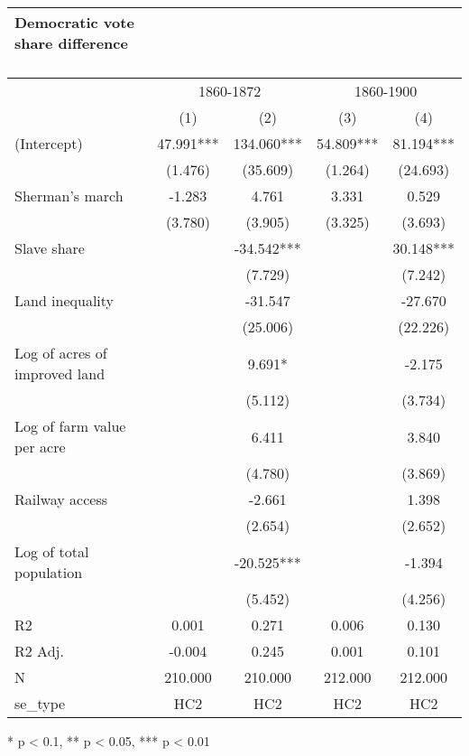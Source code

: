 \captionsetup[table]{labelformat=empty,skip=1pt}
\begin{longtable}{lcccc}
\caption*{
\large Democratic vote share difference\\ 
\small \\ 
} \\ 
\toprule
& \multicolumn{2}{c}{1860-1872} & \multicolumn{2}{c}{1860-1900} \\ 
 \cmidrule(lr){2-3}\cmidrule(lr){4-5}
  & (1) & (2) & (3) & (4) \\ 
\midrule
(Intercept) & 47.991*** & 134.060*** & 54.809*** & 81.194*** \\ 
 & (1.476) & (35.609) & (1.264) & (24.693) \\ 
Sherman's march & -1.283 & 4.761 & 3.331 & 0.529 \\ 
 & (3.780) & (3.905) & (3.325) & (3.693) \\ 
Slave share &  & -34.542*** &  & 30.148*** \\ 
 &  & (7.729) &  & (7.242) \\ 
Land inequality &  & -31.547 &  & -27.670 \\ 
 &  & (25.006) &  & (22.226) \\ 
Log of acres of improved land &  & 9.691* &  & -2.175 \\ 
 &  & (5.112) &  & (3.734) \\ 
Log of farm value per acre &  & 6.411 &  & 3.840 \\ 
 &  & (4.780) &  & (3.869) \\ 
Railway access &  & -2.661 &  & 1.398 \\ 
 &  & (2.654) &  & (2.652) \\ 
Log of total population &  & -20.525*** &  & -1.394 \\ 
 &  & (5.452) &  & (4.256) \\ 
R2 & 0.001 & 0.271 & 0.006 & 0.130 \\ 
R2 Adj. & -0.004 & 0.245 & 0.001 & 0.101 \\ 
N & 210.000 & 210.000 & 212.000 & 212.000 \\ 
se\_type & HC2 & HC2 & HC2 & HC2 \\ 
\bottomrule
\end{longtable}
\begin{minipage}{\linewidth}
* p < 0.1, ** p < 0.05, *** p < 0.01\\ 
\end{minipage}

